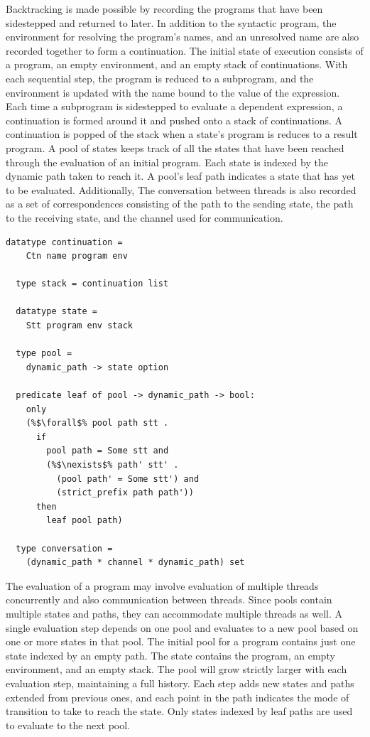 \documentclass{article}
\begin{document}
Backtracking is made possible by recording the programs that have been sidestepped and
returned to later. In addition to the syntactic program, the environment for resolving the
program's names, and an unresolved name are also recorded together to form a continuation. 
The initial state of execution consists of a program, an empty environment, and an empty stack
of continuations. With each sequential step, the program is reduced to a subprogram, and the
environment is updated with the name bound to the value of the expression. Each time a
subprogram is sidestepped to evaluate a dependent expression, a continuation is formed around
it and pushed onto a stack of continuations. A continuation is popped of the stack when a
state's program is reduces to a result program.  A pool of states keeps track of all the states
that have been reached through the evaluation of an initial program.  Each state is indexed by
the dynamic path taken to reach it. A pool's leaf path indicates a state that has yet to be
evaluated. Additionally, The conversation between threads is also recorded as a set of
correspondences consisting of the path to the sending state, the path to the receiving state,
and the channel used for communication.  

\begin{lstlisting}[language=logic, escapechar=\%]
  datatype continuation =
    Ctn name program env

  type stack = continuation list

  datatype state =
    Stt program env stack 

  type pool =
    dynamic_path -> state option

  predicate leaf of pool -> dynamic_path -> bool:
    only
    (%$\forall$% pool path stt .
      if
        pool path = Some stt and 
        (%$\nexists$% path' stt' .
          (pool path' = Some stt') and
          (strict_prefix path path'))
      then
        leaf pool path)

  type conversation =
    (dynamic_path * channel * dynamic_path) set
  \end{lstlisting}

The evaluation of a program may involve evaluation of multiple threads concurrently and also
communication between threads. Since pools contain multiple states and paths, they can
accommodate multiple threads as well.  A single evaluation step depends on one pool and
evaluates to a new pool based on one or more states in that pool. The initial pool for a
program contains just one state indexed by an empty path. The state contains the program, an
empty environment, and an empty stack. The pool will grow strictly larger with each evaluation
step, maintaining a full history. Each step adds new states and paths extended from previous
ones, and each point in the path indicates the mode of transition to take to reach the state.
Only states indexed by leaf paths are used to evaluate to the next pool.
\end{document}
